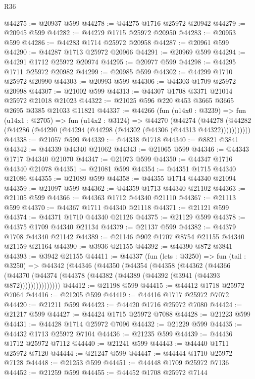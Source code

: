 \begin{lexlean}{R36}
\begin{coremodule}
@44275 := @20937 @599
@44278 := @44275 @1716 @25972 @20942
@44279 := @20945 @599
@44282 := @44279 @1715 @25972 @20950
@44283 := @20953 @599
@44286 := @44283 @1714 @25972 @20958
@44287 := @20961 @599
@44290 := @44287 @1713 @25972 @20966
@44291 := @20969 @599
@44294 := @44291 @1712 @25972 @20974
@44295 := @20977 @599
@44298 := @44295 @1711 @25972 @20982
@44299 := @20985 @599
@44302 := @44299 @1710 @25972 @20990
@44303 := @20993 @599
@44306 := @44303 @1709 @25972 @20998
@44307 := @21002 @599
@44313 := @44307 @1708 @3371 @21014 @25972 @21018 @21023
@44322 := @21025 @596 @220 @453 @3665 @3665 @2695 @3385 @21033 @11821
@44337 := @44266
    (fun (u14x0 : @3239) =>
    fun (u14x1 : @2705) =>
    fun (u14x2 : @3124) =>
    @44270
      (@44274
        (@44278 (@44282 (@44286 (@44290 (@44294 (@44298 (@44302 (@44306 (@44313 @44322)))))))))))
@44338 := @21057 @599
@44339 := @44338 @1718
@44340 := @8821 @3841
@44342 := @44339 @44340 @21062
@44343 := @21065 @599
@44346 := @44343 @1717 @44340 @21070
@44347 := @21073 @599
@44350 := @44347 @1716 @44340 @21078
@44351 := @21081 @599
@44354 := @44351 @1715 @44340 @21086
@44355 := @21089 @599
@44358 := @44355 @1714 @44340 @21094
@44359 := @21097 @599
@44362 := @44359 @1713 @44340 @21102
@44363 := @21105 @599
@44366 := @44363 @1712 @44340 @21110
@44367 := @21113 @599
@44370 := @44367 @1711 @44340 @21118
@44371 := @21121 @599
@44374 := @44371 @1710 @44340 @21126
@44375 := @21129 @599
@44378 := @44375 @1709 @44340 @21134
@44379 := @21137 @599
@44382 := @44379 @1708 @44340 @21142
@44389 := @21146 @902 @1707 @8754 @21155 @44340 @21159 @21164
@44390 := @3936 @21155
@44392 := @44390 @872 @3841
@44393 := @3942 @21155
@44411 := @44337
    (fun (lets : @3250) =>
    fun (tail : @3250) =>
    @44342
      (@44346
        (@44350
          (@44354
            (@44358
              (@44362
                (@44366
                  (@44370 (@44374 (@44378 (@44382 (@44389 (@44392 (@3941 (@44393 @872)))))))))))))))
@44412 := @21198 @599
@44415 := @44412 @1718 @25972 @7064
@44416 := @21205 @599
@44419 := @44416 @1717 @25972 @7072
@44420 := @21211 @599
@44423 := @44420 @1716 @25972 @7080
@44424 := @21217 @599
@44427 := @44424 @1715 @25972 @7088
@44428 := @21223 @599
@44431 := @44428 @1714 @25972 @7096
@44432 := @21229 @599
@44435 := @44432 @1713 @25972 @7104
@44436 := @21235 @599
@44439 := @44436 @1712 @25972 @7112
@44440 := @21241 @599
@44443 := @44440 @1711 @25972 @7120
@44444 := @21247 @599
@44447 := @44444 @1710 @25972 @7128
@44448 := @21253 @599
@44451 := @44448 @1709 @25972 @7136
@44452 := @21259 @599
@44455 := @44452 @1708 @25972 @7144

\end{coremodule}
\end{lexlean}
